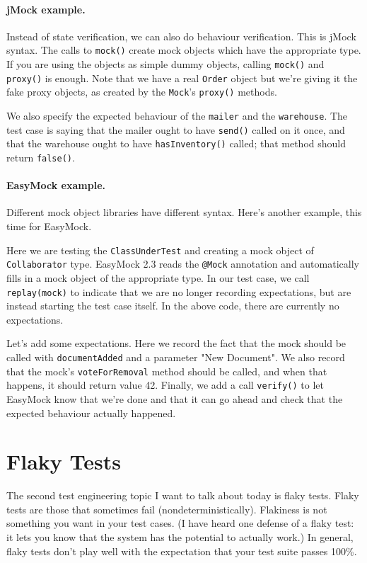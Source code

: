 \documentclass[11pt]{article}
\begin{document}
\paragraph{jMock example.} 
Instead of state verification, we can also do behaviour verification. This is
jMock syntax.
The calls to {\tt mock()} create mock objects which have the
appropriate type.  If you are using the objects as simple dummy
objects, calling {\tt mock()} and {\tt proxy()} is enough. Note that
we have a real {\tt Order} object but we're giving it the fake proxy
objects, as created by the {\tt Mock}'s {\tt proxy()} methods.

We also specify the expected behaviour of the {\tt mailer} and the
{\tt warehouse}. The test case is saying that the mailer ought to have
{\tt send()} called on it once, and that the warehouse ought to have
{\tt hasInventory()} called; that method should return {\tt false()}.

\paragraph{EasyMock example.} Different mock object libraries have different syntax. Here's 
another example, this time for EasyMock.

Here we are testing the {\tt ClassUnderTest} and creating a mock object
of {\tt Collaborator} type. EasyMock 2.3 reads the {\tt @Mock} annotation
and automatically fills in a mock object of the appropriate type.
In our test case, we call {\tt replay(mock)} to indicate that we are no
longer recording expectations, but are instead starting the test case itself.
In the above code, there are currently no expectations.

Let's add some expectations.
Here we record the fact that the mock should be called with {\tt documentAdded}
and a parameter "New Document". We also record that the mock's 
{\tt voteForRemoval} method should be called, and when that happens, it should return
value 42.
Finally, we add a call {\tt verify()} to let EasyMock
know that we're done and that it can go ahead and check that the expected behaviour actually happened.

\section*{Flaky Tests}
The second test engineering topic I want to talk about today is flaky tests. 
Flaky tests are those that sometimes fail (nondeterministically).
Flakiness is not something you want in your test cases. 
(I have heard one defense of a flaky test: it lets you know that 
the system has the potential to actually work.) 
In general, flaky tests don't play well with the expectation that
your test suite passes 100\%.
\end{document}
